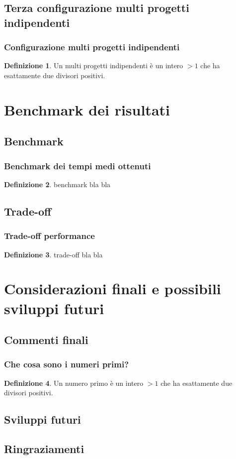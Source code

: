 \documentclass{beamer}
\theoremstyle{definition}
\newtheorem{definizione}{Definizione}
\theoremstyle{plain}
\begin{document}
\subsection{Terza configurazione multi progetti indipendenti}
\begin{frame}
\frametitle{Configurazione multi progetti indipendenti}
\begin{definizione}
Un \alert{multi progetti indipendenti} è un intero $>1$ che ha esattamente
due divisori positivi.
\end{definizione}
\end{frame}

\section{Benchmark dei risultati}

\subsection{Benchmark}
\begin{frame}
\frametitle{Benchmark dei tempi medi ottenuti}
\begin{definizione}
 \alert{benchmark} bla bla
\end{definizione}
\end{frame}

\subsection{Trade-off}
\begin{frame}
\frametitle{Trade-off performance}
\begin{definizione}
\alert{trade-off} bla bla
\end{definizione}
\end{frame}

\section{Considerazioni finali e possibili sviluppi futuri}
\subsection{Commenti finali}
\begin{frame}
\frametitle{Che cosa sono i numeri primi?}
\begin{definizione}
Un \alert{numero primo} è un intero $>1$ che ha esattamente
due divisori positivi.
\end{definizione}
\end{frame}
\subsection{Sviluppi futuri}
\subsection{Ringraziamenti}
\end{document}
